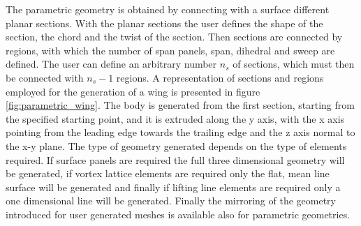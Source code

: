 The parametric geometry is obtained by connecting with a surface different planar sections. With the planar sections the user defines the shape of the section, the chord and the twist of the section. Then sections are connected by regions, with which the number of span panels, span, dihedral and sweep are defined. The user can define an arbitrary number $n_s$ of sections, which must then be connected with $n_s-1$ regions. A representation of sections and regions employed for the generation of a wing is presented in figure \ref{fig:parametric_wing}. The body is generated from the first section, starting from the specified starting point, and it is extruded along the y axis, with the x axis pointing from the leading edge towards the trailing edge and the z axis normal to the x-y plane. 
The type of geometry generated depends on the type of elements required. If surface panels are required the full three dimensional geometry will be generated, if vortex lattice elements are required only the flat, mean line surface will be generated and finally if lifting line elements are required only a one dimensional line will be generated. Finally the mirroring of the geometry introduced for user generated meshes is available also for parametric geometries.

